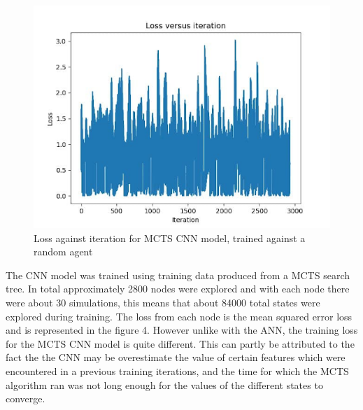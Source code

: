 \documentclass[a4paper,12pt,table]{article}
\begin{document}
\begin{figure}[H]
    \begin{center}
        \includegraphics[scale=0.65]{MCTS_CNN.png}
        \caption{Loss against iteration for MCTS CNN model, trained against a random agent}
        \label{fig:}
    \end{center}
\end{figure}
\vspace{-1cm}
The CNN model was trained using training data produced from a MCTS search tree. In total approximately 2800 nodes were explored and with each node there were about 30 simulations, this means that about 84000 total states were explored during training. The loss from each node is the mean squared error loss and is represented in the figure 4. However unlike with the ANN, the training loss for the MCTS CNN model is quite different. This can partly be attributed to the fact the the CNN may be overestimate the value of certain features which were encountered in a previous training iterations, and the time for which the MCTS algorithm ran was not long enough for the values of the different states to converge. \par
\end{document}
